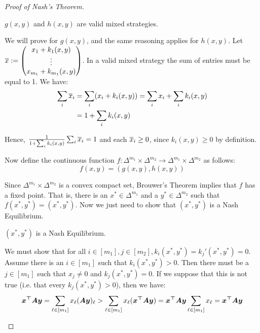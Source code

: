 \begin{proof}[Proof of Nash's Theorem]
		\begin{claim*}
			$g(x,y)$ and $h(x,y)$ are valid mixed strategies.
		\end{claim*}
		\begin{subproof}
			We will prove for $g(x,y)$, and the same reasoning applies for
			$h(x,y)$.  Let $\overline{x} := \begin{pmatrix}
				x_1 + k_1(x,y) \\
				\vdots \\
				x_{m_1} + k_{m_1}(x,y) \\
			\end{pmatrix}$. In a valid mixed strategy the sum of entries must
			be equal to 1. We have:
			\begin{equation*}
				\begin{split}
					\sum_i \overline{x}_i & = \sum_i (x_i + k_i(x,y)) = \sum_i x_i +
					\sum_i k_i(x,y) \\
					& = 1 + \sum_i k_i(x,y)
				\end{split}
			\end{equation*}

			Hence, $\frac{1}{1 + \sum_i k_i(x,y)} \sum_i \overline{x}_i = 1$ and
			each $\overline{x}_i \ge 0$, since $k_i(x,y) \ge 0$ by definition.
		\end{subproof}

		Now define the continuous function $f:\Delta^{m_1} \times
		\Delta^{m_2} \rightarrow \Delta^{m_1} \times \Delta^{m_2}$ as
		follows:
		\begin{equation}
			f(x,y) = (g(x,y), h(x,y))
		\end{equation}

		Since $\Delta^{m_1} \times \Delta^{m_2}$ is a convex compact set,
		Brouwer's Theorem implies that $f$ has a fixed point. That is, there is
		an $x^* \in \Delta^{m_1}$ and a $y^* \in \Delta^{m_2}$ such that
		$f(x^*,y^*) = (x^*,y^*)$. Now we just need to show that $(x^*,y^*)$ is
		a Nash Equilibrium.

		\begin{claim*}
			$(x^*, y^*)$ is a Nash Equilibrium.
		\end{claim*}
		\begin{subproof}
			We must show that for all $i \in [m_1], j \in [m_2], k_i(x^*,y^*) =
			k_j'(x^*,y^*) = 0$. Assume there is an $i \in [m_1]$ such that
			$k_i(x^*,y^*) > 0$. Then there must be a $j \in [m_1]$ such that
			$x_j \neq 0$ and $k_j(x^*, y^*) = 0$. If we suppose that this is
			not true (i.e. that every $k_j(x^*,y^*) > 0$), then we have:
			\begin{equation*}
				\bm{x^\top A y} = \sum_{\ell \in [m_1]} x_\ell
				(\bm{Ay})_\ell > \sum_{\ell \in [m_1]} x_\ell (\bm{x^\top A
				y}) = \bm{x^\top A y} \sum_{\ell \in [m_1]} x_\ell =
				\bm{x^\top A y}
			\end{equation*}


\end{subproof}
\end{proof}
